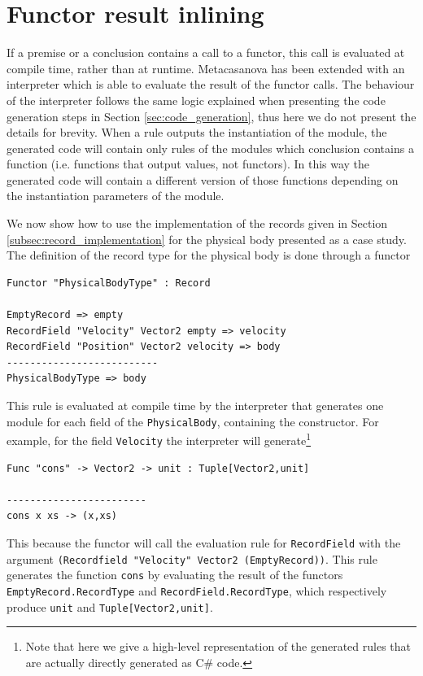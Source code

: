 \section{Functor result inlining}
If a premise or a conclusion contains a call to a functor, this call is evaluated at compile time, rather than at runtime. Metacasanova has been extended with an interpreter which is able to evaluate the result of the functor calls. The behaviour of the interpreter follows the same logic explained when presenting the code generation steps in Section \ref{sec:code_generation}, thus here we do not present the details for brevity. When a rule outputs the instantiation of the module, the generated code will contain only rules of the modules which conclusion contains a function (i.e. functions that output values, not functors). In this way the generated code will contain a different version of those functions depending on the instantiation parameters of the module.

We now show how to use the implementation of the records given in Section \ref{subsec:record_implementation} for the physical body presented as a case study.
The definition of the record type for the physical body is done through a functor

\begin{lstlisting}
Functor "PhysicalBodyType" : Record

EmptyRecord => empty
RecordField "Velocity" Vector2 empty => velocity
RecordField "Position" Vector2 velocity => body
--------------------------
PhysicalBodyType => body
\end{lstlisting}

This rule is evaluated at compile time by the interpreter that generates one module for each field of the \texttt{PhysicalBody}, containing the constructor. For example, for the field \texttt{Velocity} the interpreter will generate\footnote{Note that here we give a high-level representation of the generated rules that are actually directly generated as C\# code.}

\begin{lstlisting}
Func "cons" -> Vector2 -> unit : Tuple[Vector2,unit]

------------------------
cons x xs -> (x,xs)
\end{lstlisting}

This because the functor will call the evaluation rule for \texttt{RecordField} with the argument \texttt{(Recordfield "Velocity" Vector2 (EmptyRecord))}. This rule generates the function \texttt{cons} by evaluating the result of the functors\\ \texttt{EmptyRecord.RecordType} and \texttt{RecordField.RecordType}, which respectively produce \texttt{unit} and \texttt{Tuple[Vector2,unit]}.

